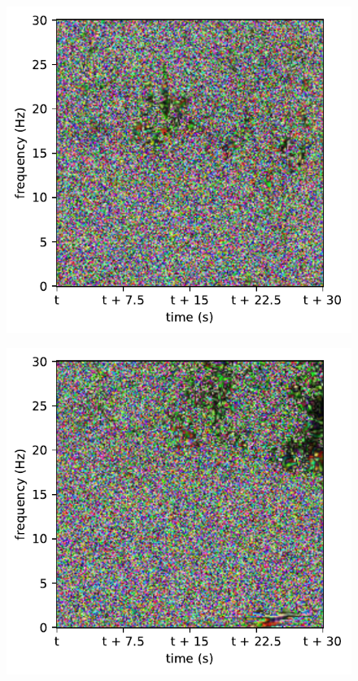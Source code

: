 \begin{subfigure}{.16\textwidth}
  \centering
  \includegraphics[width=1\linewidth]{./pics/class_master_2}
  \caption{}
  \label{fig_1_23}
\end{subfigure}%
\begin{subfigure}{.16\textwidth}
  \centering
  \includegraphics[width=1\linewidth]{./pics/class_master_3}
  \caption{}
  \label{fig_1_24}
\end{subfigure}%
